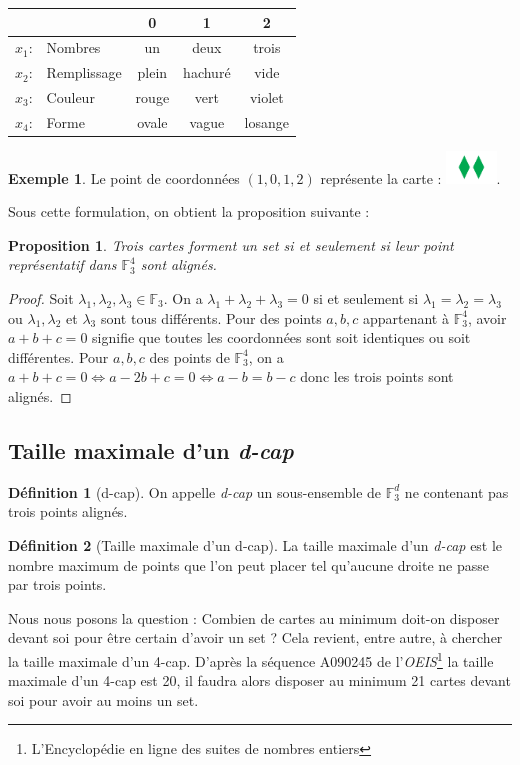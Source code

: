 \documentclass[a4paper,12pt,titlepage]{article}
\theoremstyle{plain}
\newtheorem{prop}{Proposition}
\theoremstyle{definition}
\newtheorem{defi}{Définition}
\newtheorem{ex}{Exemple}
\newcommand{\Ftrois}[1]{\mathbb{F}^#1_3}
\begin{document}
\begin{center}
\begin{tabular}{r l | c c c }
 & & 0 & 1 & 2 \\
\hline
$x_1$: & Nombres     & un		& deux	  & trois 	\\
$x_2$: & Remplissage & plein 	& hachuré & vide 	\\
$x_3$: & Couleur     & rouge	& vert	  & violet 	\\
$x_4$: & Forme       & ovale	& vague	  & losange \\
\end{tabular}
\end{center}

\begin{ex}
Le point de coordonnées $(1,0,1,2)$ représente la carte : \includegraphics[width=0.1\textwidth]{Img/1012.png}.
\end{ex}

\noindent Sous cette formulation, on obtient la proposition suivante :
\begin{prop}
Trois cartes forment un set si et seulement si leur point représentatif dans  $\Ftrois{4}$ sont alignés.
\end{prop}
\begin{proof}
Soit $\lambda_1,\lambda_2,\lambda_3 \in \mathbb{F}_3$. On a $\lambda_1 + \lambda_2 + \lambda_3 = 0$ si et seulement si $\lambda_1=\lambda_2=\lambda_3$ ou $\lambda_1,\lambda_2$ et $\lambda_3$ sont tous différents. Pour des points $a,b,c$ appartenant à  $\Ftrois{4}$, avoir $a+b+c=0$ signifie que toutes les coordonnées sont soit identiques ou soit différentes.
Pour $a,b,c$ des points de  $\Ftrois{4}$, on a $a+b+c=0 \iff a-2b+c=0 \iff a-b=b-c$ donc les trois points sont alignés.
\end{proof}


\subsection{Taille maximale d'un \emph{d-cap}}
\begin{defi}[d-cap]
On appelle \emph{d-cap} un sous-ensemble de  $\Ftrois{d}$ ne contenant pas trois points alignés.
\end{defi}
\begin{defi}[Taille maximale d'un d-cap]
La taille maximale d'un \emph{d-cap} est le nombre maximum de points que l'on peut placer tel qu'aucune droite ne passe par trois points.
\end{defi}
Nous nous posons la question : Combien de cartes au minimum doit-on disposer devant soi pour être certain d'avoir un set ?
Cela revient, entre autre, à chercher la taille maximale d'un 4-cap. D'après la séquence A090245 de l'\emph{OEIS}\footnote{L'Encyclopédie en ligne des suites de nombres entiers} la taille maximale d'un 4-cap est 20, il faudra alors disposer au minimum 21 cartes devant soi pour avoir au moins un set.
\end{document}

